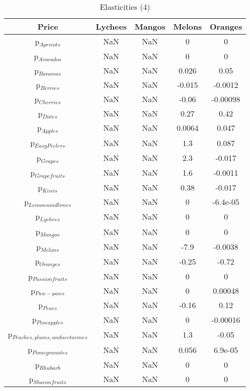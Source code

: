 \documentclass[11pt]{article}
\begin{document}
\begin{table}[h]
\caption{Elasticities (4)}
\label{Table: elasticities 4}
\begin{center}
\begin{tabular}{ccccc}
Price & Lychees & Mangos & Melons & Oranges \\ \hline
p$_{Apricots}$ & NaN & NaN & 0 & 0 \\ 
p$_{Avocados}$ & NaN & NaN & 0 & 0 \\ 
p$_{Bananas}$ & NaN & NaN & 0.026 & 0.05 \\ 
p$_{Berries}$ & NaN & NaN & -0.015 & -0.0012 \\ 
p$_{Cherries}$ & NaN & NaN & -0.06 & -0.00098 \\ 
p$_{Dates}$ & NaN & NaN & 0.27 & 0.42 \\ 
p$_{Apples}$ & NaN & NaN & 0.0064 & 0.047 \\ 
p$_{Easy Peelers}$ & NaN & NaN & 1.3 & 0.087 \\ 
p$_{Grapes}$ & NaN & NaN & 2.3 & -0.017 \\ 
p$_{Grapefruits}$ & NaN & NaN & 1.6 & -0.0011 \\ 
p$_{Kiwis}$ & NaN & NaN & 0.38 & -0.017 \\ 
p$_{Lemons and limes}$ & NaN & NaN & 0 & -6.4e-05 \\ 
p$_{Lychees}$ & NaN & NaN & 0 & 0 \\ 
p$_{Mangos}$ & NaN & NaN & 0 & 0 \\ 
p$_{Melons}$ & NaN & NaN & -7.9 & -0.0038 \\ 
p$_{Oranges}$ & NaN & NaN & -0.25 & -0.72 \\ 
p$_{Passion fruits}$ & NaN & NaN & 0 & 0 \\ 
p$_{Paw-paws}$ & NaN & NaN & 0 & 0.00048 \\ 
p$_{Pears}$ & NaN & NaN & -0.16 & 0.12 \\ 
p$_{Pineapples}$ & NaN & NaN & 0 & -0.00016 \\ 
p$_{Peaches, plums, and nectarines}$ & NaN & NaN & 1.3 & -0.05 \\ 
p$_{Pomegranates}$ & NaN & NaN & 0.056 & 6.9e-05 \\ 
p$_{Rhubarb}$ & NaN & NaN & 0 & 0 \\ 
p$_{Sharon fruits}$ & NaN & NaN & 0 & 0 \\ 
\end{tabular}
\end{center}
\end{table}
\end{document}
